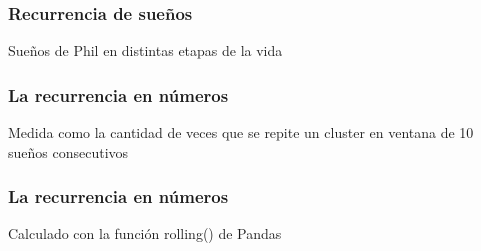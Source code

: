 \documentclass{beamer}
\begin{document}
\begin{frame}
\frametitle{Recurrencia de sueños}
Sueños de Phil en distintas etapas de la vida
\end{frame}


\begin{frame}
\frametitle{La recurrencia en números}
Medida como la cantidad de veces que se repite un cluster en ventana de 10 sueños consecutivos
\end{frame}

\begin{frame}
\frametitle{La recurrencia en números}
Calculado con la función rolling() de Pandas
\end{frame}
\end{document}
